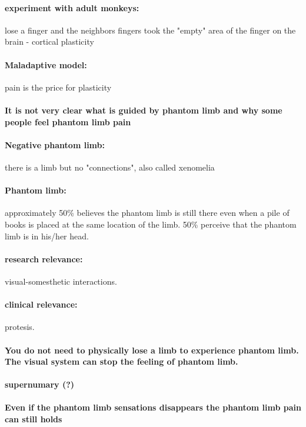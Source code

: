 \documentclass[12pt,article,oneside,a4paper]{memoir}
\begin{document}
\paragraph{experiment with adult monkeys:} lose a finger and the neighbors fingers took the "empty" area of the finger on the brain - cortical plasticity
\paragraph{Maladaptive model:} pain is the price for plasticity
\paragraph{It is not very clear what is guided by phantom limb and why some people feel phantom limb pain}
\paragraph{Negative phantom limb:} there is a limb but no "connections", also called xenomelia
\paragraph{Phantom limb:} approximately 50\% believes the phantom limb is still there even when a pile of books is placed at the same location of the limb. 50\% perceive that the phantom limb is in his/her head.
\paragraph{research relevance:} visual-somesthetic interactions.
\paragraph{clinical relevance:} protesis.

\paragraph{You do not need to physically lose a limb to experience phantom limb. The visual system can stop the feeling of phantom limb.}

\paragraph{supernumary (?)}
\paragraph{Even if the phantom limb sensations disappears the phantom limb pain can still holds}
\end{document}
